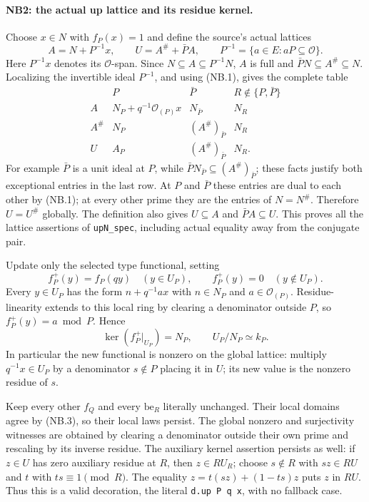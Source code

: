 \paragraph{NB2: the actual up lattice and its residue kernel.}
Choose $x\in N$ with $f_P(x)=1$ and define the source's actual lattices
\[
 A=N+P^{-1}x,\qquad U=A^\#+\bar P A,
 \qquad P^{-1}=\{a\in E:aP\subseteq\mathcal O\}.
 \tag{NB.2}
\]
Here $P^{-1}x$ denotes its $\mathcal O$-span. Since
$N\subseteq A\subseteq P^{-1}N$, $A$ is full and
$\bar P N\subseteq A^\#\subseteq N$. Localizing the invertible ideal
$P^{-1}$, and using (NB.1), gives the complete table
\[
\begin{array}{c|ccc}
 &P&\bar P&R\notin\{P,\bar P\}\\ \hline
 A&N_P+q^{-1}\mathcal O_{(P)}x&N_{\bar P}&N_R\\
 A^\#&N_P&(A^\#)_{\bar P}&N_R\\
 U&A_P&(A^\#)_{\bar P}&N_R.
\end{array}                                                    \tag{NB.3}
\]
For example $\bar P$ is a unit ideal at $P$, while
$\bar P N_{\bar P}\subseteq(A^\#)_{\bar P}$; these facts justify
both exceptional entries in the last row. At $P$ and $\bar P$ these
entries are dual to each other by (NB.1); at every other prime they are
the entries of $N=N^\#$. Therefore $U=U^\#$ globally. The definition
also gives $U\subseteq A$ and $\bar P A\subseteq U$. This proves all
the lattice assertions of \texttt{upN\_spec}, including actual equality
away from the conjugate pair.

Update only the selected type functional, setting
\[
 f_P^+(y)=f_P(qy)\quad(y\in U_P),\qquad
 f_P^+(y)=0\quad(y\notin U_P).                       \tag{NB.4}
\]
Every $y\in U_P$ has the form $n+q^{-1}a x$ with
$n\in N_P$ and $a\in\mathcal O_{(P)}$. Residue-linearity extends to
this local ring by clearing a denominator outside $P$, so
$f_P^+(y)=a\bmod P$. Hence
\[
 \ker(f_P^+|_{U_P})=N_P,\qquad U_P/N_P\simeq k_P.     \tag{NB.5}
\]
In particular the new functional is nonzero on the global lattice:
multiply $q^{-1}x\in U_P$ by a denominator $s\notin P$ placing it in
$U$; its new value is the nonzero residue of $s$.

Keep every other $f_Q$ and every $\mathrm{be}_R$ literally unchanged.
Their local domains agree by (NB.3), so their local laws persist.
The global nonzero and surjectivity witnesses are obtained by clearing
a denominator outside their own prime and rescaling by its inverse
residue. The auxiliary kernel assertion persists as well: if
$z\in U$ has zero auxiliary residue at $R$, then $z\in R U_R$;
choose $s\notin R$ with $sz\in R U$ and $t$ with
$ts\equiv1\pmod R$. The equality
$z=t(sz)+(1-ts)z$ puts $z$ in $RU$. Thus this is a valid decoration,
the literal \texttt{d.up P q x}, with no fallback case.

